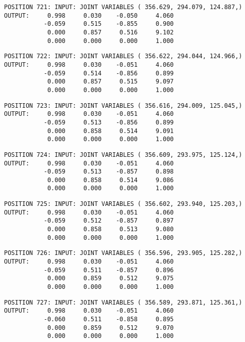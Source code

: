 \begin{verbatim}
POSITION 721: INPUT: JOINT VARIABLES ( 356.629, 294.079, 124.887,)
OUTPUT:     0.998     0.030    -0.050     4.060
           -0.059     0.515    -0.855     0.900
            0.000     0.857     0.516     9.102
            0.000     0.000     0.000     1.000
\end{verbatim} \pagebreak[1]\begin{verbatim}
POSITION 722: INPUT: JOINT VARIABLES ( 356.622, 294.044, 124.966,)
OUTPUT:     0.998     0.030    -0.051     4.060
           -0.059     0.514    -0.856     0.899
            0.000     0.857     0.515     9.097
            0.000     0.000     0.000     1.000
\end{verbatim} \pagebreak[1]\begin{verbatim}
POSITION 723: INPUT: JOINT VARIABLES ( 356.616, 294.009, 125.045,)
OUTPUT:     0.998     0.030    -0.051     4.060
           -0.059     0.513    -0.856     0.899
            0.000     0.858     0.514     9.091
            0.000     0.000     0.000     1.000
\end{verbatim} \pagebreak[1]\begin{verbatim}
POSITION 724: INPUT: JOINT VARIABLES ( 356.609, 293.975, 125.124,)
OUTPUT:     0.998     0.030    -0.051     4.060
           -0.059     0.513    -0.857     0.898
            0.000     0.858     0.514     9.086
            0.000     0.000     0.000     1.000
\end{verbatim} \pagebreak[1]\begin{verbatim}
POSITION 725: INPUT: JOINT VARIABLES ( 356.602, 293.940, 125.203,)
OUTPUT:     0.998     0.030    -0.051     4.060
           -0.059     0.512    -0.857     0.897
            0.000     0.858     0.513     9.080
            0.000     0.000     0.000     1.000
\end{verbatim} \pagebreak[1]\begin{verbatim}
POSITION 726: INPUT: JOINT VARIABLES ( 356.596, 293.905, 125.282,)
OUTPUT:     0.998     0.030    -0.051     4.060
           -0.059     0.511    -0.857     0.896
            0.000     0.859     0.512     9.075
            0.000     0.000     0.000     1.000
\end{verbatim} \pagebreak[1]\begin{verbatim}
POSITION 727: INPUT: JOINT VARIABLES ( 356.589, 293.871, 125.361,)
OUTPUT:     0.998     0.030    -0.051     4.060
           -0.060     0.511    -0.858     0.895
            0.000     0.859     0.512     9.070
            0.000     0.000     0.000     1.000
\end{verbatim} \pagebreak[1]\begin{verbatim}

\end{verbatim}

